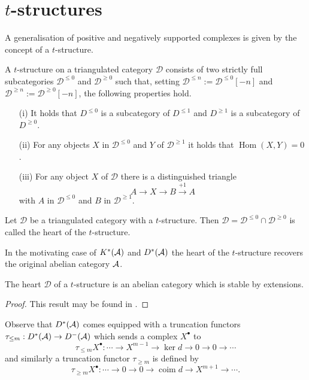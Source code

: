 \section{$t$-structures}
A generalisation of positive and negatively supported complexes is given by the concept of a $t$-structure.
\begin{definition}
 A $t$-structure on a triangulated category $\mathcal{D}$ consists of two strictly full subcategories $\mathcal{D}^{\leq 0}$ and $\mathcal{D}^{\geq 0}$ such that, setting $\mathcal{D}^{\leq n} := \mathcal{D}^{\leq 0}[-n]$ and $\mathcal{D}^{\geq n} := \mathcal{D}^{\geq 0} [-n]$, the following properties hold.
 \begin{enumerate}
   \item[(i)] It holds that $D^{\leq 0}$ is a subcategory of $D^{\leq 1}$ and $D^{\geq 1}$ is a subcategory of $D^{\geq 0}$.
   \item[(ii)] For any objects $X$ in $\mathcal{D}^{\leq 0}$ and $Y$ of $\mathcal{D}^{\geq 1}$ it holds that $\operatorname{Hom}(X,Y) = 0$.
   \item[(iii)] For any object $X$ of $\mathcal{D}$ there is a distinguished triangle
   $$A \to X \to B \xrightarrow{+1} A $$
   with $A$ in $\mathcal{D}^{\leq 0}$ and $B$ in $\mathcal{D}^{\geq 1}$.
 \end{enumerate}
\end{definition}
\begin{definition}
 Let $\mathcal{D}$ be a triangulated category with a $t$-structure. Then $\mathcal{D} = \mathcal{D}^{\leq 0} \cap \mathcal{D}^{\geq 0}$ is called the heart of the $t$-structure.
\end{definition}
In the motivating case of $K^*(\AA)$ and $D^*(\AA)$ the heart of the $t$-structure recovers the original abelian category $\AA$.
\begin{proposition}\label{prop: HeartExtension}
 The heart $\mathcal{D}$ of a $t$-structure is an abelian category which is stable by extensions.
\end{proposition}
\begin{proof}
  This result may be found in \cite[Chapter 5]{dimca2004sheaves}.
\end{proof}
Observe that $D^*(\AA)$ comes equipped with a truncation functors
$\tau_{\leq m}:D^*(\AA)\to D^-(\AA)$ which sends a complex $X^\bullet$ to
$$\tau_{\leq m}X^\bullet : \cdots \to X^{m-1} \to \ker d \to 0 \to 0 \to \cdots$$
and similarly a truncation functor $\tau_{\geq m}$ is defined by
$$\tau_{\geq m}X^\bullet: \cdots \to 0 \to 0 \to \operatorname{coim} d \to X^{m+1}\to \cdots.$$
